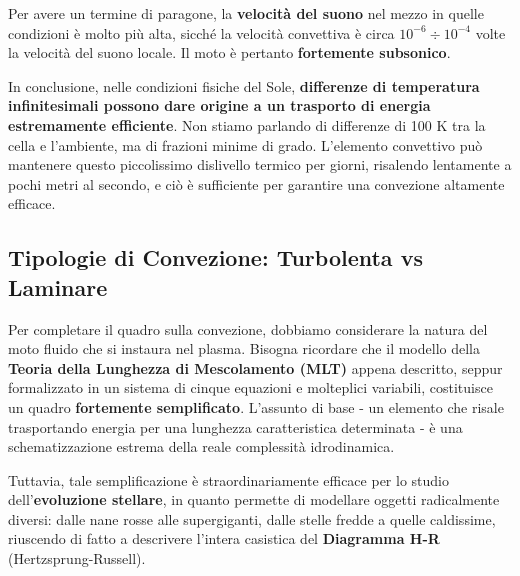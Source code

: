 Per avere un termine di paragone, la \textbf{velocità del suono} nel mezzo in quelle condizioni è molto più alta, sicché la velocità convettiva è circa $10^{-6} \div 10^{-4}$ volte la velocità del suono locale. Il moto è pertanto \textbf{fortemente subsonico}.

In conclusione, nelle condizioni fisiche del Sole, \textbf{differenze di temperatura infinitesimali possono dare origine a un trasporto di energia estremamente efficiente}. Non stiamo parlando di differenze di 100 K tra la cella e l'ambiente, ma di frazioni minime di grado. L'elemento convettivo può mantenere questo piccolissimo dislivello termico per giorni, risalendo lentamente a pochi metri al secondo, e ciò è sufficiente per garantire una convezione altamente efficace.

\subsection{Tipologie di Convezione: Turbolenta vs Laminare}

Per completare il quadro sulla convezione, dobbiamo considerare la natura del moto fluido che si instaura nel plasma. Bisogna ricordare che il modello della \textbf{Teoria della Lunghezza di Mescolamento (MLT)} appena descritto, seppur formalizzato in un sistema di cinque equazioni e molteplici variabili, costituisce un quadro \textbf{fortemente semplificato}.
L'assunto di base - un elemento che risale trasportando energia per una lunghezza caratteristica determinata - è una schematizzazione estrema della reale complessità idrodinamica.

Tuttavia, tale semplificazione è straordinariamente efficace per lo studio dell'\textbf{evoluzione stellare}, in quanto permette di modellare oggetti radicalmente diversi: dalle nane rosse alle supergiganti, dalle stelle fredde a quelle caldissime, riuscendo di fatto a descrivere l'intera casistica del \textbf{Diagramma H-R} (Hertzsprung-Russell).

